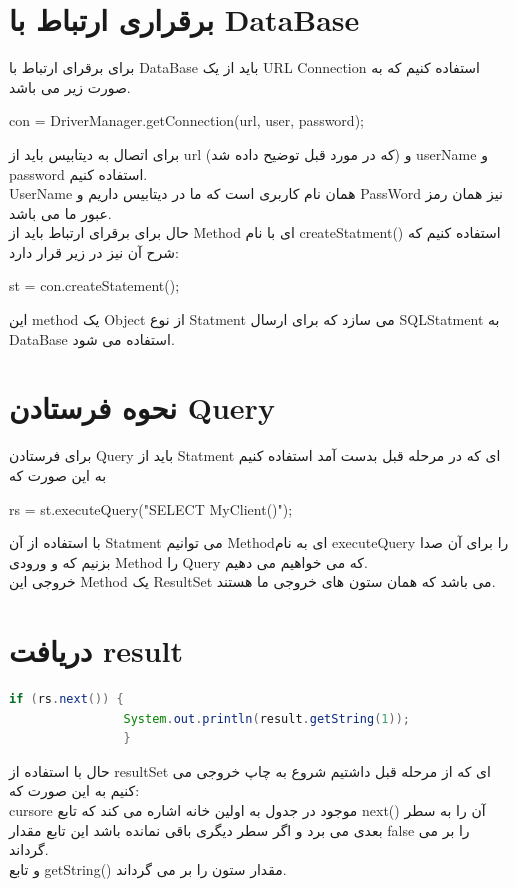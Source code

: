 \documentclass[a4paper]{article}
\begin{document}
			\section{برقراری ارتباط با DataBase}
			برای برقرای ارتباط با DataBase باید از یک  
			URL Connection
			استفاده کنیم که به صورت زیر می باشد.
			\begin{latin}
				con = DriverManager.getConnection(url, user, password); 
			\end{latin}
			برای اتصال به دیتابیس باید از
			 url
			 (که در مورد قبل توضیح داده شد) و 
			userName
			و
			password
			استفاده کنیم.\\
			UserName
			همان نام کاربری است که ما در دیتابیس داریم و PassWord نیز همان رمز عبور ما می باشد.\\
			
			حال برای برقرای ارتباط باید از 
			Method
			ای با نام createStatment() استفاده کنیم که شرح آن نیز در زیر قرار دارد:
			\begin{latin}
				st = con.createStatement();
			\end{latin}
			این
			method
			یک 
			Object
			از نوع
			Statment
			می سازد که برای ارسال 
			SQLStatment
			به 
			DataBase
			استفاده می شود.\\
			\section{نحوه فرستادن Query}
			برای فرستادن 
			Query
			باید از 
			Statment
			ای که در مرحله قبل بدست آمد  استفاده کنیم به این صورت که 
			\begin{latin}
				rs = st.executeQuery("SELECT MyClient()");
			\end{latin}
			با استفاده از آن 
			Statment
			می توانیم Methodای به نام 
			executeQuery 
			را برای آن صدا بزنیم که و ورودی 
			Method
			را 
			Query 
			که می خواهیم می دهیم.\\
			خروجی این 
			Method
			یک 
			ResultSet
			می باشد که همان ستون های خروجی ما هستند.
			
			
			\section{دریافت result}
			\begin{latin}
				\begin{lstlisting}[language=Java]
				if (rs.next()) {
				System.out.println(result.getString(1));
				} 
				\end{lstlisting}
			\end{latin}
			حال با استفاده از resultSet ای که از مرحله قبل داشتیم شروع به چاپ خروجی می کنیم به این صورت که:\\
			cursore
			موجود در جدول به اولین خانه اشاره می کند که تابع
			next()
			آن را به سطر بعدی می برد و اگر سطر دیگری باقی نمانده باشد این تابع مقدار
			false
			را بر می گرداند.\\
			و تابع
			 getString()
			 مقدار  ستون را بر می گرداند.
			 
\end{document}
